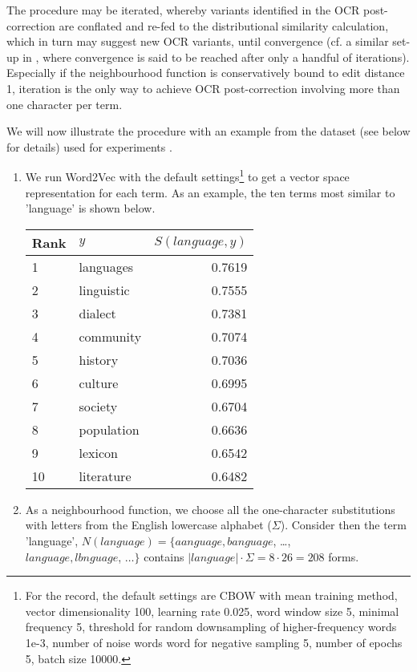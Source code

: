 \documentclass{sig-alternate}
\begin{document}
The procedure may be iterated, whereby variants identified in the OCR
post-correction are conflated and re-fed to the distributional
similarity calculation, which in turn may suggest new OCR variants,
until convergence (cf. a similar set-up in \cite[1351]{ocr:Reffle},
where convergence is said to be reached after only a handful of
iterations). Especially if the neighbourhood function is
conservatively bound to edit distance 1, iteration is the only way to
achieve OCR post-correction involving more than one character per
term.

We will now illustrate the procedure with an example from the dataset
(see below for details) used for experiments .

\begin{enumerate}
\item We run Word2Vec with the default settings\footnote{For the record, the default settings are CBOW with mean training method, vector dimensionality 100, learning rate 0.025, word window size 5, minimal frequency 5, threshold for random downsampling of higher-frequency words 1e-3, number of noise words word for negative sampling 5, number of epochs 5, batch size 10000.} to get a vector space representation for each term. As an example, the ten terms most similar to
'language' is shown below.

  \begin{tabular}{l|l|r}
    Rank & $y$ & $S(language, y)$\\ \hline
1 & languages & 0.7619\\
2 & linguistic & 0.7555\\
3 & dialect & 0.7381\\
4 & community & 0.7074\\
5 & history & 0.7036\\
6 & culture & 0.6995\\
7 & society & 0.6704\\
8 & population & 0.6636\\
9 & lexicon & 0.6542\\
10 & literature & 0.6482\\
\end{tabular}

\item As a neighbourhood function, we choose all the one-character
  substitutions with letters from the English lowercase alphabet
  ($\Sigma$). Consider then the term 'language', $N(language) = \{aanguage, banguage$, \ldots{},\\ $language, lbnguage$, $\ldots{}\}$
  contains $|language| \cdot \Sigma = 8 \cdot 26 = 208$ forms.


\end{enumerate}
\end{document}

